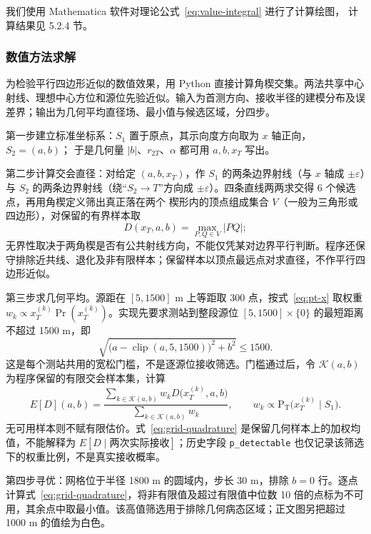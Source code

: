 我们使用 Mathematica 软件对理论公式~\eqref{eq:value-integral} 进行了计算绘图，
计算结果见 5.2.4 节。

\subsubsection{数值方法求解}
为检验平行四边形近似的数值效果，用 Python 直接计算角楔交集。两法共享中心射线、理想中心方位和源位先验近似。输入为首测方向、接收半径的建模分布及误差界；输出为几何平均直径场、最小值与候选区域，分四步。

第一步建立标准坐标系：$S_1$ 置于原点，其示向度方向取为 $x$ 轴正向，$S_2=(a,b)$；
于是几何量 $|b|$、$r_{2T}$、$\alpha$ 都可用 $a,b,x_T$ 写出。

第二步计算交会直径：对给定 $(a,b,x_T)$，作 $S_1$ 的两条边界射线（与 $x$ 轴成
$\pm\varepsilon$）与 $S_2$ 的两条边界射线（绕“$S_2\!\to\!T$”方向成
$\pm\varepsilon$）。四条直线两两求交得 6 个候选点，再用角楔定义筛出真正落在两个
楔形内的顶点组成集合 $V$（一般为三角形或四边形），对保留的有界样本取
\begin{equation}
    D(x_T,a,b)=\max_{P,Q\in V}|PQ| ;
    \label{eq:grid-diameter}
\end{equation}
无界性取决于两角楔是否有公共射线方向，不能仅凭某对边界平行判断。程序还保守排除近共线、退化及非有限样本；保留样本以顶点最远点对求直径，不作平行四边形近似。

第三步求几何平均。源距在 $[5,1500]$ m 上等距取 300 点，按式~\eqref{eq:pt-x} 取权重 $w_k\propto x_T^{(k)}\Pr(x_T^{(k)})$。实现先要求测站到整段源位 $[5,1500]\times\{0\}$ 的最短距离不超过 1500 m，即
\[
 \sqrt{\bigl(a-\operatorname{clip}(a,5,1500)\bigr)^2+b^2}\le1500.
\]
这是每个测站共用的宽松门槛，不是逐源位接收筛选。门槛通过后，令 $\mathcal K(a,b)$ 为程序保留的有限交会样本集，计算
\begin{equation}
    E[D](a,b)=\frac{\sum_{k\in\mathcal{K}(a,b)}w_kD\bigl(x_T^{(k)},a,b\bigr)}
    {\sum_{k\in\mathcal{K}(a,b)}w_k},
    \qquad w_k\propto \mathrm{P_T}\bigl(x_T^{(k)}\mid S_1\bigr).
    \label{eq:grid-quadrature}
\end{equation}
无可用样本则不赋有限估价。式~\eqref{eq:grid-quadrature} 是保留几何样本上的加权均值，不能解释为 $E[D\mid\text{两次实际接收}]$；历史字段 \texttt{p\_detectable} 也仅记录该筛选下的权重比例，不是真实接收概率。

第四步寻优：网格位于半径 1800 m 的圆域内，步长 30 m，排除 $b=0$ 行。逐点计算式~\eqref{eq:grid-quadrature}，将非有限值及超过有限值中位数 10 倍的点标为不可用，其余点中取最小值。该高值筛选用于排除几何病态区域；正文图另把超过 1000 m 的值绘为白色。

